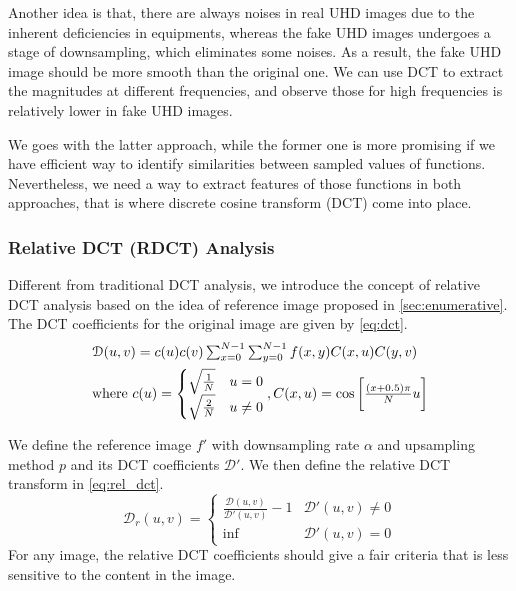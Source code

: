 \documentclass[journal,conference]{IEEEtran}
\begin{document}
Another idea is that, there are always noises in real UHD images due to the inherent deficiencies in equipments, whereas the fake UHD images undergoes a stage of downsampling, which eliminates some noises.
As a result, the fake UHD image should be more smooth than the original one.
We can use DCT to extract the magnitudes at different frequencies, and observe those for high frequencies is relatively lower in fake UHD images.

We goes with the latter approach, while the former one is more promising if we have efficient way to identify similarities between sampled values of functions.
Nevertheless, we need a way to extract features of those functions in both approaches, that is where discrete cosine transform (DCT) come into place.

\subsubsection{Relative DCT (RDCT) Analysis}
Different from traditional DCT analysis, we introduce the concept of relative DCT analysis based on the idea of reference image proposed in \ref{sec:enumerative}.
The DCT coefficients for the original image are given by \eqref{eq:dct}.
\begin{equation}
	\begin{array}{l}
		\mathcal{D}(u, v) = c(u)c(v)\sum_{x=0}^{N-1}\sum_{y=0}^{N-1}f(x, y)C(x, u)C(y, v)\\
		\vspace{-0.75em}\\
		\text{where } c(u) = \begin{cases}
			\sqrt{\frac{1}{N}} & u = 0 \\
			\sqrt{\frac{2}{N}} & u \neq 0
		\end{cases}, C(x, u) = \cos\bigg[\frac{(x+0.5)\pi}{N}u\bigg]
	\end{array}
	\label{eq:dct}
\end{equation}

We define the reference image $f'$ with downsampling rate $\alpha$ and upsampling method $p$ and its DCT coefficients $\mathcal{D}'$.
We then define the relative DCT transform in \eqref{eq:rel_dct}.
\begin{equation}
	\mathcal{D}_r(u, v) = \begin{cases}
		\frac{\mathcal{D}(u, v)}{\mathcal{D}'(u, v)} - 1 & \mathcal{D}'(u, v) \neq 0 \\
		\inf & \mathcal{D}'(u, v) = 0
	\end{cases}
	\label{eq:rel_dct}
\end{equation}
For any image, the relative DCT coefficients should give a fair criteria that is less sensitive to the content in the image.
\end{document}
